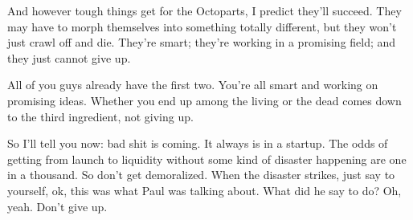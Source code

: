 And however tough things get for the Octoparts, I predict they'll
succeed. They may have to morph themselves into something totally
different, but they won't just crawl off and die. They're smart; they're
working in a promising field; and they just cannot give up.

All of you guys already have the first two. You're all smart and working
on promising ideas. Whether you end up among the living or the dead
comes down to the third ingredient, not giving up.

So I'll tell you now: bad shit is coming. It always is in a startup. The
odds of getting from launch to liquidity without some kind of disaster
happening are one in a thousand. So don't get demoralized. When the
disaster strikes, just say to yourself, ok, this was what Paul was
talking about. What did he say to do? Oh, yeah. Don't give up.
